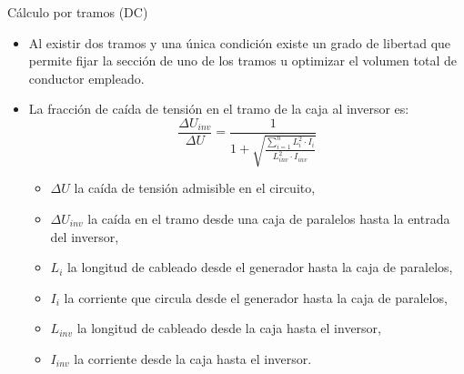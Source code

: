\documentclass[aspectratio=169, usenames,svgnames,dvipsnames]{beamer}
\begin{document}
\begin{frame}[label={sec:org03ddf15}]{Cálculo por tramos (DC)}
\begin{itemize}
\item Al existir dos tramos y una única condición existe un grado de libertad que permite fijar la sección de uno de los tramos u optimizar el volumen total de conductor empleado.

\item La fracción de caída de tensión en el tramo de la caja al inversor es:  
\begin{equation*}
  \frac{\Delta U_{inv}}{\Delta U}= \frac{1}{1+\sqrt{\frac{\sum_{i=1}^nL_{i}^2
        \cdot I_{i}}{L_{inv}^2 \cdot I_{inv}}}}
\end{equation*}

\begin{itemize}
\item \(\Delta U\) la caída de tensión admisible en el circuito,

\item \(\Delta U_{inv}\) la caída en el tramo desde una caja de paralelos hasta la entrada del inversor,

\item \(L_i\) la longitud de cableado desde el generador hasta la caja de paralelos,

\item \(I_i\) la corriente que circula desde el generador hasta la caja de paralelos,

\item \(L_{inv}\) la longitud de cableado desde la caja hasta el inversor,

\item \(I_{inv}\) la corriente desde la caja hasta el inversor.
\end{itemize}
\end{itemize}
\end{frame}
\end{document}
